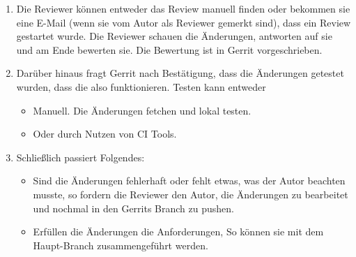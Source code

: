\begin{itemize}
\begin{enumerate}
			\item Die Reviewer können entweder das Review manuell finden oder bekommen sie eine E-Mail (wenn sie vom Autor als Reviewer gemerkt sind), dass ein Review
				 gestartet wurde. Die Reviewer schauen die Änderungen, antworten auf sie und am Ende bewerten sie. Die Bewertung ist in Gerrit vorgeschrieben.
				 
			\item Darüber hinaus fragt Gerrit nach Bestätigung, dass die Änderungen getestet wurden, dass die also funktionieren. Testen kann entweder
			\begin{itemize}
				\item Manuell. Die Änderungen fetchen und lokal testen.
				\item Oder durch Nutzen von \ac{CI} Tools.
			\end{itemize}
			
			\item Schließlich passiert Folgendes:
			\begin{itemize}
				\item Sind die Änderungen fehlerhaft oder fehlt etwas, was der Autor beachten musste, so fordern die Reviewer den Autor, die Änderungen zu bearbeitet
			 		und nochmal in den Gerrits Branch zu pushen.
			 	\item Erfüllen die Änderungen die Anforderungen, So können sie mit dem Haupt-Branch zusammengeführt werden.
			\end{itemize}			
			
		\end{enumerate}	
\end{itemize}

